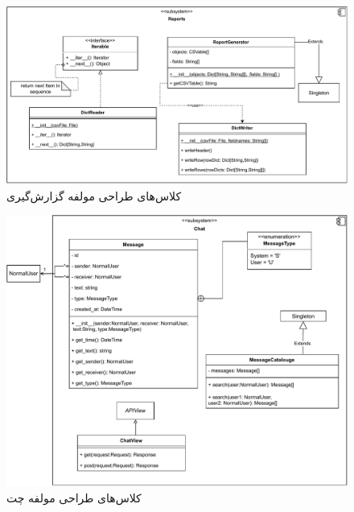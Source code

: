 \eject  \pdfpagewidth=10in \pdfpageheight=10in

\begin{figure}[ht!]
	\centering
	\includegraphics[scale=0.8]{figs/design-class/reports.pdf}
	\caption{کلاس‌های طراحی مولفه گزارش‌گیری}
\end{figure}
\FloatBarrier
\newpage

\recalctypearea

\begin{figure}[ht!]
	\centering
	\includegraphics[scale=0.8]{figs/design-class/chat.pdf}
	\caption{کلاس‌های طراحی مولفه چت}
\end{figure}
\FloatBarrier
\newpage

